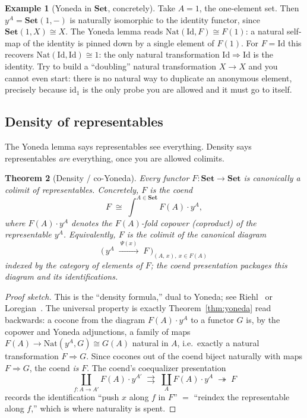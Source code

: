 \documentclass[11pt]{article}
\theoremstyle{plain}
\newtheorem{theorem}{Theorem}[section]
\theoremstyle{definition}
\newtheorem{example}[theorem]{Example}
\newcommand{\Set}{\mathbf{Set}}
\newcommand{\yA}{y^{A}}
\newcommand{\Nat}{\mathrm{Nat}}
\newcommand{\id}{\mathrm{id}}
\newcommand{\iso}{\cong}
\begin{document}
\begin{example}[Yoneda in $\Set$, concretely]
\label{ex:yoneda}
Take $A=1$, the one-element set. Then $\yA = \Set(1,-)$ is naturally isomorphic to
the identity functor, since $\Set(1,X)\iso X$. The Yoneda lemma reads
$\Nat(\mathrm{Id},F)\iso F(1)$: a natural self-map of the identity is pinned down
by a single element of $F(1)$. For $F=\mathrm{Id}$ this recovers
$\Nat(\mathrm{Id},\mathrm{Id})\iso 1$: the only natural transformation
$\mathrm{Id}\Rightarrow\mathrm{Id}$ is the identity. Try to build a
``doubling'' natural transformation $X\to X$ and you cannot even start: there is
no natural way to duplicate an anonymous element, precisely because $\id_{1}$ is
the only probe you are allowed and it must go to itself.
\end{example}

\subsection{Density of representables}
\label{sub:density}

The Yoneda lemma says representables see everything. Density says representables
\emph{are} everything, once you are allowed colimits.

\begin{theorem}[Density / co-Yoneda]
\label{thm:density}
Every functor $F\colon\Set\to\Set$ is canonically a colimit of representables.
Concretely, $F$ is the coend
\[
  F \;\iso\; \int^{A\in\Set} F(A)\cdot \yA,
\]
where $F(A)\cdot\yA$ denotes the $F(A)$-fold copower (coproduct) of the
representable $\yA$. Equivalently, $F$ is the colimit of the canonical diagram
\[
  \bigl(\, \yA \;\xrightarrow{\ \Psi(x)\ }\; F \,\bigr)_{(A,\,x),\ x\in F(A)}
\]
indexed by the category of elements of $F$; the coend presentation packages this
diagram and its identifications.
\end{theorem}

\begin{proof}[Proof sketch]
This is the ``density formula,'' dual to Yoneda; see
Riehl~\cite[\S6.2]{Riehl} or Loregian~\cite[Ch.~2]{Loregian}. The universal
property is exactly Theorem~\ref{thm:yoneda} read backwards: a cocone from the
diagram $F(A)\cdot\yA$ to a functor $G$ is, by the copower and Yoneda
adjunctions, a family of maps $F(A)\to \Nat(\yA,G)\iso G(A)$ natural in $A$, i.e.\
exactly a natural transformation $F\Rightarrow G$. Since cocones out of the coend
biject naturally with maps $F\Rightarrow G$, the coend \emph{is} $F$. The coend's
coequalizer presentation
\[
  \coprod_{f\colon A\to A'} F(A)\cdot y^{A'}
  \;\rightrightarrows\;
  \coprod_{A} F(A)\cdot \yA
  \;\twoheadrightarrow\; F
\]
records the identification ``push $x$ along $f$ in $F$'' $=$ ``reindex the
representable along $f$,'' which is where naturality is spent. \end{proof}
\end{document}

